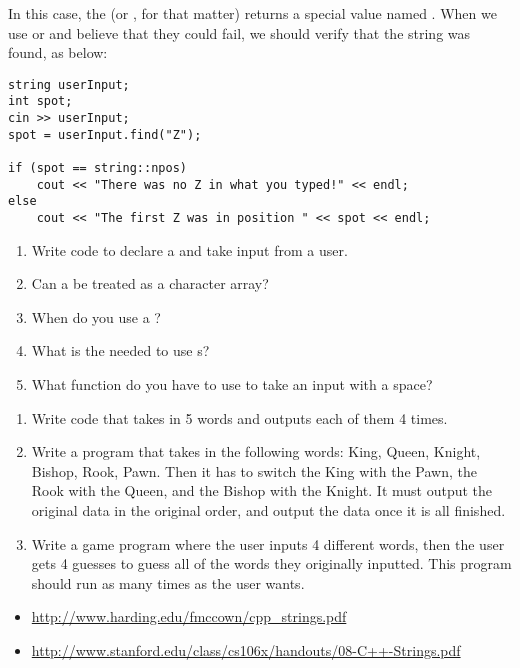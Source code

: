 \noindent In this case, the  (or , for that matter) returns a special value named .
When we use  or  and believe that they could fail, we should verify that the string was found, as below:

\noindent\begin{minipage}{\linewidth}\begin{lstlisting}
string userInput;
int spot;
cin >> userInput;
spot = userInput.find("Z");

if (spot == string::npos)
	cout << "There was no Z in what you typed!" << endl;
else
	cout << "The first Z was in position " << spot << endl;
\end{lstlisting}\end{minipage}
\begin{enumerate}
\item Write code to declare a  and take input from a user.
\item Can a  be treated as a character array?
\item When do you use a ?
\item What is the  needed to use s?
\item What function do you have to use to take an input with a space?
\end{enumerate}

\begin{enumerate}
\item Write code that takes in 5 words and outputs each of them 4 times.

\item Write a program that takes in the following words: King, Queen, Knight, Bishop, Rook, Pawn. 
Then it has to switch the King with the Pawn, the Rook with the Queen, and the Bishop with the Knight.
It must output the original data in the original order, and output the data once it is all finished.

\item Write a game program where the user inputs 4 different words, then the user gets 4 guesses to guess all of the words they originally inputted.
This program should run as many times as the user wants.
\end{enumerate}



\begin{itemize}
\item \url{http://www.harding.edu/fmccown/cpp_strings.pdf}
\item \url{http://www.stanford.edu/class/cs106x/handouts/08-C++-Strings.pdf}
\end{itemize}
